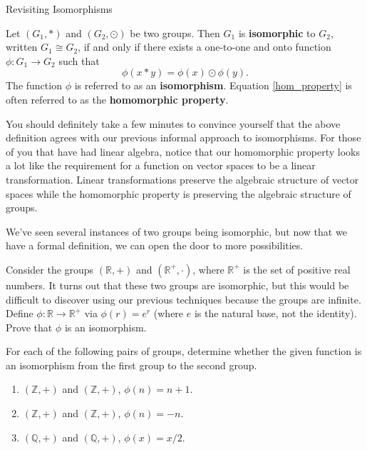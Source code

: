 \begin{section}{Revisiting Isomorphisms}
\begin{definition}\label{def:iso}
Let $(G_1,*)$ and $(G_2,\odot)$ be two groups.  Then $G_1$ is \textbf{isomorphic} to $G_2$, written $G_1\cong G_2$, if and only if there exists a one-to-one and onto function $\phi:G_1\to G_2$ such that
\begin{equation}\label{hom_property}
\phi(x*y)=\phi(x)\odot \phi(y).
\end{equation}
The function $\phi$ is referred to as an \textbf{isomorphism}.  Equation \ref{hom_property} is often referred to as the \textbf{homomorphic property}.
\end{definition}

You should definitely take a few minutes to convince yourself that the above definition agrees with our previous informal approach to isomorphisms.  For those of you that have had linear algebra, notice that our homomorphic property looks a lot like the requirement for a function on vector spaces to be a linear transformation.  Linear transformations preserve the algebraic structure of vector spaces while the homomorphic property is preserving the algebraic structure of groups.

We've seen several instances of two groups being isomorphic, but now that we have a formal definition, we can open the door to more possibilities.

\begin{problem}
Consider the groups $(\mathbb{R},+)$ and $(\mathbb{R}^+,\cdot)$, where $\mathbb{R}^+$ is the set of positive real numbers.  It turns out that these two groups are isomorphic, but this would be difficult to discover using our previous techniques because the groups are infinite.  Define $\phi:\mathbb{R}\to \mathbb{R}^+$ via $\phi(r)=e^r$ (where $e$ is the natural base, not the identity). Prove that $\phi$ is an isomorphism.
\end{problem}

\begin{exercise}
For each of the following pairs of groups, determine whether the given function is an isomorphism from the first group to the second group.
\begin{enumerate}[label=\rm{(\alph*)}]
\item $(\mathbb{Z},+)$ and $(\mathbb{Z},+)$, $\phi(n)=n+1$.
\item $(\mathbb{Z},+)$ and $(\mathbb{Z},+)$, $\phi(n)=-n$.
\item $(\mathbb{Q},+)$ and $(\mathbb{Q},+)$, $\phi(x)=x/2$.
\end{enumerate}


\end{exercise}
\end{section}
